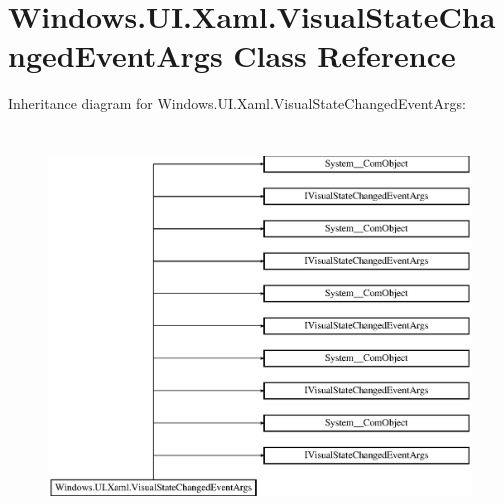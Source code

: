 \hypertarget{class_windows_1_1_u_i_1_1_xaml_1_1_visual_state_changed_event_args}{}\section{Windows.\+U\+I.\+Xaml.\+Visual\+State\+Changed\+Event\+Args Class Reference}
\label{class_windows_1_1_u_i_1_1_xaml_1_1_visual_state_changed_event_args}
Inheritance diagram for Windows.\+U\+I.\+Xaml.\+Visual\+State\+Changed\+Event\+Args\+:\begin{figure}[H]
\begin{center}
\leavevmode
\includegraphics[height=10.476191cm]{class_windows_1_1_u_i_1_1_xaml_1_1_visual_state_changed_event_args}
\end{center}
\end{figure}
